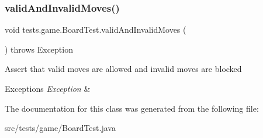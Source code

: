 \subsubsection{\texorpdfstring{valid\+And\+Invalid\+Moves()}{validAndInvalidMoves()}}
{\footnotesize\ttfamily void tests.\+game.\+Board\+Test.\+valid\+And\+Invalid\+Moves (\begin{DoxyParamCaption}{ }\end{DoxyParamCaption}) throws Exception}

Assert that valid moves are allowed and invalid moves are blocked 
\begin{DoxyExceptions}{Exceptions}
{\em Exception} & \\
\hline
\end{DoxyExceptions}


The documentation for this class was generated from the following file\+:\begin{DoxyCompactItemize}
\item 
src/tests/game/Board\+Test.\+java\end{DoxyCompactItemize}

